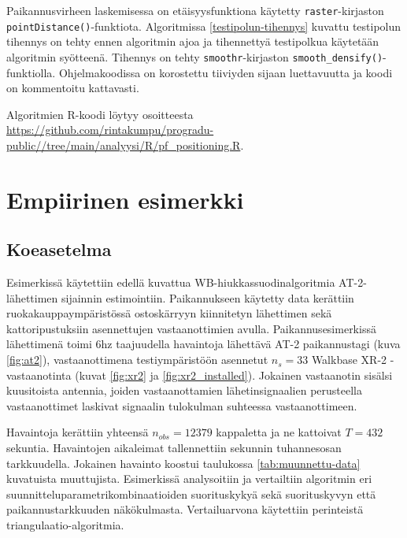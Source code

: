 \documentclass[
  12pt,
  a4paper, twoside]{book}
\begin{document}
Paikannusvirheen laskemisessa on etäisyysfunktiona käytetty \texttt{raster}-kirjaston \texttt{pointDistance()}-funktiota. Algoritmissa \ref{testipolun-tihennys} kuvattu testipolun tihennys on tehty ennen algoritmin ajoa ja tihennettyä testipolkua käytetään algoritmin syötteenä. Tihennys on tehty \texttt{smoothr}-kirjaston \texttt{smooth\_densify()}-funktiolla. Ohjelmakoodissa on korostettu tiiviyden sijaan luettavuutta ja koodi on kommentoitu kattavasti.

\noindent Algoritmien R-koodi löytyy osoitteesta \url{https://github.com/rintakumpu/progradu-public//tree/main/analyysi/R/pf_positioning.R}.

\section{Empiirinen esimerkki} \label{empiirinen-esimerkki}

\subsection{Koeasetelma} \label{koeasetelma}

Esimerkissä käytettiin edellä kuvattua WB-hiukkassuodinalgoritmia AT-2-lähettimen sijainnin estimointiin. Paikannukseen käytetty data kerättiin ruokakauppaympäristössä ostoskärryyn kiinnitetyn lähettimen sekä kattoripustuksiin asennettujen vastaanottimien avulla. Paikannusesimerkissä lähettimenä toimi 6hz taajuudella havaintoja lähettävä AT-2 paikannustagi (kuva \ref{fig:at2}), vastaanottimena testiympäristöön asennetut \(n_s=33\) Walkbase XR-2 -vastaanotinta (kuvat \ref{fig:xr2} ja \ref{fig:xr2_installed}). Jokainen vastaanotin sisälsi kuusitoista antennia, joiden vastaanottamien lähetinsignaalien perusteella vastaanottimet laskivat signaalin tulokulman suhteessa vastaanottimeen.

Havaintoja kerättiin yhteensä \(n_{obs}=12379\) kappaletta ja ne kattoivat \(T=432\) sekuntia. Havaintojen aikaleimat tallennettiin sekunnin tuhannesosan tarkkuudella. Jokainen havainto koostui taulukossa \ref{tab:muunnettu-data} kuvatuista muuttujista. Esimerkissä analysoitiin ja vertailtiin algoritmin eri suunnitteluparametrikombinaatioiden suorituskykyä sekä suorituskyvyn että paikannustarkkuuden näkökulmasta. Vertailuarvona käytettiin perinteistä triangulaatio-algoritmia.

\newpage
\end{document}
